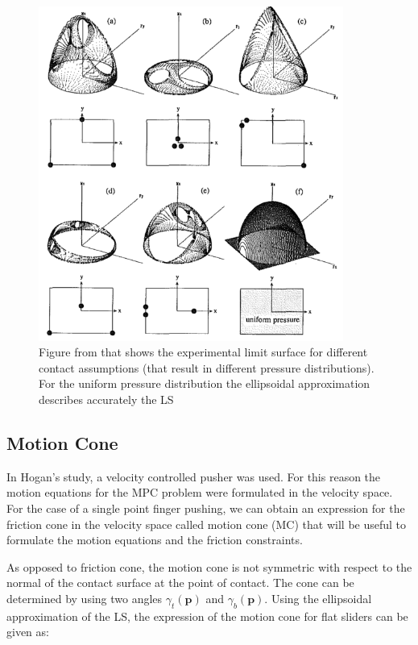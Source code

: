 \documentclass[12,twoside]{TFG-GM}
\theoremstyle{definition}
\theoremstyle{remark}
\begin{document}
\begin{figure}[htb!]
\begin{center}
\includegraphics[width=10cm]{ell_limit_surfaces.png}
\end{center}
\caption[test caption]{\label{fig:ls_ellipsoid} \small{Figure from \protect\cite{ellipsoidal_ls} that shows the experimental limit surface for different contact assumptions (that result in different pressure distributions). For the uniform pressure distribution the ellipsoidal approximation describes accurately the LS}}
\end{figure}

\subsection{Motion Cone}
In Hogan's study, a velocity controlled pusher was used. For this reason the motion equations for the MPC problem were formulated in the velocity space. For the case of a single point finger pushing, we can obtain an expression for the friction cone in the velocity space called motion cone (MC) \cite{pushing4} that will be useful to formulate the motion equations and the friction constraints.

As opposed to friction cone, the motion cone is not symmetric with respect to the normal of the contact surface at the point of contact. The cone can be determined by using two angles $\gamma_{t}(\textbf{p})$ and $\gamma_b(\textbf{p})$. Using the ellipsoidal approximation of the LS, the expression of the motion cone for flat sliders can be given as:
\end{document}
